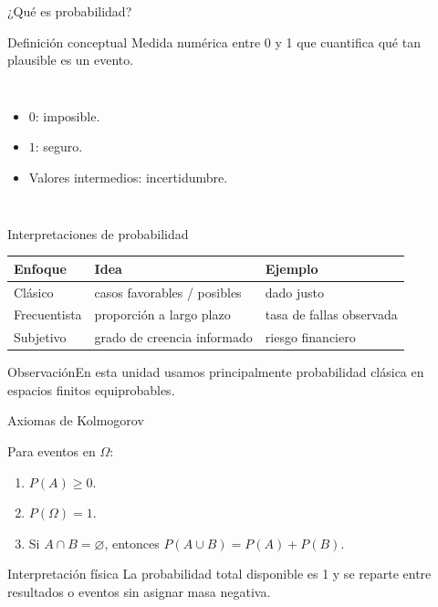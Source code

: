 \documentclass[aspectratio=169,11pt]{beamer}
\newcommand{\observacion}[1]{\begin{block}{Observación}#1\end{block}}
\begin{document}
\begin{frame}{¿Qué es probabilidad?}
\begin{block}{Definición conceptual}
Medida numérica entre 0 y 1 que cuantifica qué tan plausible es un evento.
\end{block}
\begin{columns}[T]
\begin{itemize}
  \item $0$: imposible.
  \item $1$: seguro.
  \item Valores intermedios: incertidumbre.
\end{itemize}
\end{columns}
\end{frame}

\begin{frame}{Interpretaciones de probabilidad}
\small
\begin{tabular}{p{}p{}p{}}
\toprule
Enfoque & Idea & Ejemplo \\
\midrule
Clásico & casos favorables / posibles & dado justo \\
Frecuentista & proporción a largo plazo & tasa de fallas observada \\
Subjetivo & grado de creencia informado & riesgo financiero \\
\bottomrule
\end{tabular}
\vspace{0.6em}
\observacion{En esta unidad usamos principalmente probabilidad clásica en espacios finitos equiprobables.}
\end{frame}

\begin{frame}{Axiomas de Kolmogorov}
\begin{theorem}[Axiomas]
Para eventos en $\Omega$:
\begin{enumerate}
  \item $P(A)\ge 0$.
  \item $P(\Omega)=1$.
  \item Si $A\cap B=\varnothing$, entonces $P(A\cup B)=P(A)+P(B)$.
\end{enumerate}
\end{theorem}
\pause
\begin{exampleblock}{Interpretación física}
La probabilidad total disponible es 1 y se reparte entre resultados o eventos sin asignar masa negativa.
\end{exampleblock}
\end{frame}
\end{document}
